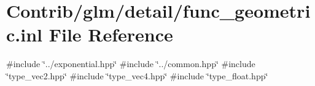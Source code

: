 \hypertarget{func__geometric_8inl}{}\section{Contrib/glm/detail/func\+\_\+geometric.inl File Reference}
\label{func__geometric_8inl}
{\ttfamily \#include \char`\"{}../exponential.\+hpp\char`\"{}}\newline
{\ttfamily \#include \char`\"{}../common.\+hpp\char`\"{}}\newline
{\ttfamily \#include \char`\"{}type\+\_\+vec2.\+hpp\char`\"{}}\newline
{\ttfamily \#include \char`\"{}type\+\_\+vec4.\+hpp\char`\"{}}\newline
{\ttfamily \#include \char`\"{}type\+\_\+float.\+hpp\char`\"{}}\newline
